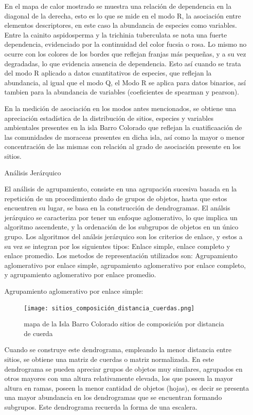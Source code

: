 \documentclass[11pt,]{article}
\begin{document}
En el mapa de calor mostrado se muestra una relación de dependencia en
la diagonal de la derecha, esto es lo que se mide en el modo R, la
asociación entre elementos descriptores, en este caso la abundancia de
especies como variables. Entre la cainito aspidosperma y la trichinia
tuberculata se nota una fuerte dependencia, evidenciado por la
continuidad del color fucsia o rosa. Lo mismo no ocurre con los colores
de los bordes que reflejan franjas más pequeñas, y a su vez degradadas,
lo que evidencia ausencia de dependencia. Esto así cuando se trata del
modo R aplicado a datos cuantitativos de especies, que reflejan la
abundancia, al igual que el modo Q, el Modo R se aplica para datos
binarios, así tambien para la abundancia de variables (coeficientes de
spearman y pearson).

En la medición de asociación en los modos antes mencionados, se obtiene
una apreciación estadística de la distribución de sitios, especies y
variables ambientales presentes en la isla Barro Colorado que reflejan
la cuatificaación de las comunidades de moraceas presentes en dicha
isla, así como la mayor o menor concentración de las mismas con relación
al grado de asociación presente en los sitios.

Análisis Jerárquico

El análisis de agrupamiento, consiste en una agrupación sucesiva basada
en la repetición de un procedimiento dado de grupos de objetos, hasta
que estos encuentren su lugar, se basa en la construcción de
dendrogramas. El análsis jerárquico se caracteriza por tener un enfoque
aglomerativo, lo que implica un algoritmo ascendente, y la ordenación de
los subgrupos de objetos en un único grupo. Los algoritmos del análsis
jerárquico son los criterios de enlace, y estos a su vez se integran por
los siguientes tipos: Enlace simple, enlace completo y enlace promedio.
Los metodos de representación utilizados son: Agrupamiento aglomerativo
por enlace simple, agrupamiento aglomerativo por enlace completo, y
agrupamiento aglomerativo por enlace promedio.

Agrupamiento aglomerativo por enlace simple:

\begin{figure}
\centering
\texttt{[image: sitios\_composición\_distancia\_cuerdas.png]}
\caption{mapa de la Isla Barro Colorado sitios de composición por
distancia de cuerda \label{fig:bci_map}}
\end{figure}

Cuando se construye este dendrograma, empleando la menor distancia entre
sitios, se obtiene una matriz de cuerdas o matriz normalizada. En este
dendrograma se pueden apreciar grupos de objetos muy similares,
agrupados en otros mayores con una altura relativamente elevada, los que
poseen la mayor altura en ramas, poseen la menor cantidad de objetos
(hojas), es decir se presenta una mayor abundancia en los dendrogramas
que se encuentran formando subgrupos. Este dendrograma recuerda la forma
de una escalera.
\end{document}
